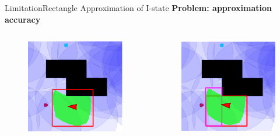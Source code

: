 \documentclass[10pt]{beamer}
\begin{document}
\begin{frame}{Limitation}{Rectangle Approximation of I-state}
  \textbf{Problem: approximation accuracy}
   \begin{columns}
    \begin{column}{0.45\textwidth}
      \begin{figure}
        \includegraphics[width=0.5\linewidth]{figs/rect_approx}
      \end{figure}
    \end{column}
    \begin{column}{0.45\textwidth}
      \begin{figure}
        \includegraphics[width=0.5\linewidth]{figs/dbrect_approx}
      \end{figure}
    \end{column}
  \end{columns}
\end{frame}
\end{document}
